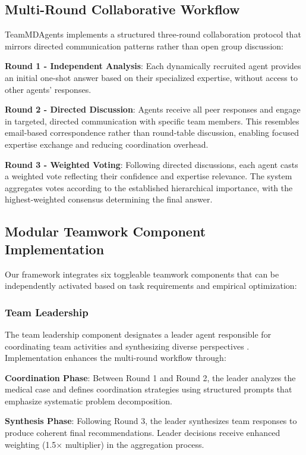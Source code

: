 \documentclass[letterpaper]{article} %
\begin{document}
\subsection{Multi-Round Collaborative Workflow}

TeamMDAgents implements a structured three-round collaboration protocol that mirrors directed communication patterns rather than open group discussion:

\textbf{Round 1 - Independent Analysis}: Each dynamically recruited agent provides an initial one-shot answer based on their specialized expertise, without access to other agents' responses.

\textbf{Round 2 - Directed Discussion}: Agents receive all peer responses and engage in targeted, directed communication with specific team members. This resembles email-based correspondence rather than round-table discussion, enabling focused expertise exchange and reducing coordination overhead.

\textbf{Round 3 - Weighted Voting}: Following directed discussions, each agent casts a weighted vote reflecting their confidence and expertise relevance. The system aggregates votes according to the established hierarchical importance, with the highest-weighted consensus determining the final answer.

\subsection{Modular Teamwork Component Implementation}

Our framework integrates six toggleable teamwork components that can be independently activated based on task requirements and empirical optimization:

\subsubsection{Team Leadership}
The team leadership component designates a leader agent responsible for coordinating team activities and synthesizing diverse perspectives \cite{zaccaro2001team}. Implementation enhances the multi-round workflow through:

\textbf{Coordination Phase}: Between Round 1 and Round 2, the leader analyzes the medical case and defines coordination strategies using structured prompts that emphasize systematic problem decomposition.

\textbf{Synthesis Phase}: Following Round 3, the leader synthesizes team responses to produce coherent final recommendations. Leader decisions receive enhanced weighting (1.5× multiplier) in the aggregation process.
\end{document}
